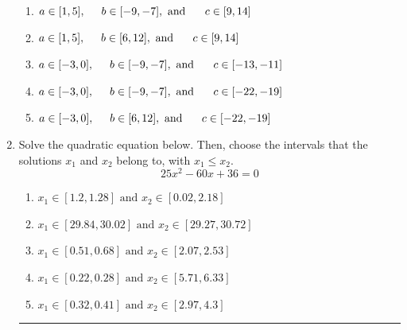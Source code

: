 \documentclass[14pt]{extbook}
\newcommand{\litem}[1]{\item#1\hspace*{-1cm}\rule{\textwidth}{0.4pt}}
\begin{document}
\begin{enumerate}
{\begin{center}
\end{center}
\begin{enumerate}[label=\Alph*.]
\item \( a \in [1, 5], \hspace*{5mm} b \in [-9, -7], \text{ and } \hspace*{5mm} c \in [9, 14] \)
\item \( a \in [1, 5], \hspace*{5mm} b \in [6, 12], \text{ and } \hspace*{5mm} c \in [9, 14] \)
\item \( a \in [-3, 0], \hspace*{5mm} b \in [-9, -7], \text{ and } \hspace*{5mm} c \in [-13, -11] \)
\item \( a \in [-3, 0], \hspace*{5mm} b \in [-9, -7], \text{ and } \hspace*{5mm} c \in [-22, -19] \)
\item \( a \in [-3, 0], \hspace*{5mm} b \in [6, 12], \text{ and } \hspace*{5mm} c \in [-22, -19] \)

\end{enumerate} }
\litem{
Solve the quadratic equation below. Then, choose the intervals that the solutions $x_1$ and $x_2$ belong to, with $x_1 \leq x_2$.\[ 25x^{2} -60 x + 36 = 0 \]\begin{enumerate}[label=\Alph*.]
\item \( x_1 \in [1.2, 1.28] \text{ and } x_2 \in [0.02, 2.18] \)
\item \( x_1 \in [29.84, 30.02] \text{ and } x_2 \in [29.27, 30.72] \)
\item \( x_1 \in [0.51, 0.68] \text{ and } x_2 \in [2.07, 2.53] \)
\item \( x_1 \in [0.22, 0.28] \text{ and } x_2 \in [5.71, 6.33] \)
\item \( x_1 \in [0.32, 0.41] \text{ and } x_2 \in [2.97, 4.3] \)


\end{enumerate}}
\end{enumerate}
\end{document}
